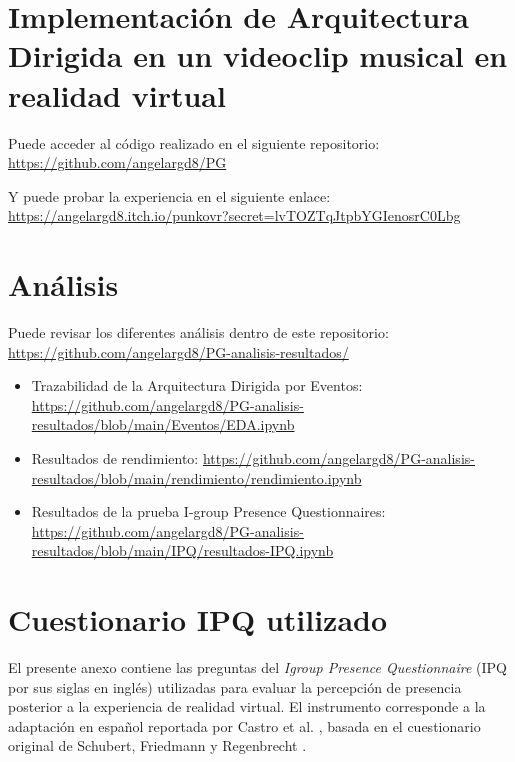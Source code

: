 \section{Implementación de Arquitectura Dirigida en un videoclip musical en realidad virtual}
Puede acceder al código realizado en el siguiente repositorio: \url{https://github.com/angelargd8/PG}


Y puede probar la experiencia en el siguiente enlace:  \url{https://angelargd8.itch.io/punkovr?secret=lvTOZTqJtpbYGIenosrC0Lbg}
\section{Análisis}
Puede revisar los diferentes análisis dentro de este repositorio: \url{https://github.com/angelargd8/PG-analisis-resultados/}

\begin{itemize}
    \item Trazabilidad de la Arquitectura Dirigida por Eventos: \url{https://github.com/angelargd8/PG-analisis-resultados/blob/main/Eventos/EDA.ipynb}
    \item Resultados de rendimiento: \url{https://github.com/angelargd8/PG-analisis-resultados/blob/main/rendimiento/rendimiento.ipynb}
    \item Resultados de la prueba I-group Presence Questionnaires: \url{https://github.com/angelargd8/PG-analisis-resultados/blob/main/IPQ/resultados-IPQ.ipynb}

\end{itemize}


\section{Cuestionario IPQ utilizado}
\label{anexo:cuestionario-ipq}

El presente anexo contiene las preguntas del \emph{Igroup Presence Questionnaire}
(IPQ por sus siglas en inglés) utilizadas para evaluar la percepción de presencia posterior a la
experiencia de realidad virtual. El instrumento corresponde a la adaptación en
español reportada por Castro et al. \cite{castro2026immersive}, basada en el
cuestionario original de Schubert, Friedmann y Regenbrecht
\cite{schubert2001experience}.




